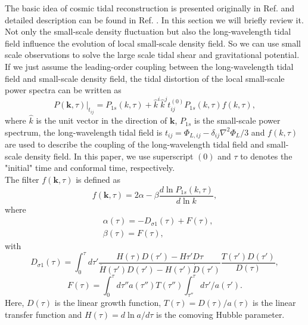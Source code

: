 The basic idea of cosmic tidal reconstruction is presented originally in 
Ref. \citep{2012:pen} and detailed description can be found in 
Ref. \citep{2015:zhu}.
In this section we will briefly review it.\\

Not only the small-scale density fluctuation but also the long-wavelength
 tidal field influence the evolution of local small-scale density field. So
 we can use small scale observations to solve the large scale tidal shear 
 and gravitational potential. If we just assume the leading-order coupling
 between the long-wavelength tidal field and small-scale density field, 
  the tidal distortion of the local small-scale power spectra can be 
  written as
\begin{equation}
P(\mathbf{k},\tau)|_{t_{ij}}=P_{1s}(k,\tau)+\hat{k}^{i}\hat{k}^{j}t_{ij}^{(0)}P_{1s}(k,\tau)f(k,\tau),
\label{equ:Pk_s}
\end{equation}
where $\hat{k}$ is the unit vector in the direction of $\mathbf{k}$, 
$P_{1s}$ is the small-scale power spectrum, the long-wavelength 
tidal field is $t_{ij}=\Phi_{L,ij}-\delta_{ij}\nabla^{2}\Phi_{L}/3$ and 
$f(k,\tau)$ are used to describe the coupling of the 
long-wavelength
tidal field and small-scale density field. In this paper, we use superscript
$(0)$ and $\tau$ to denotes the "initial" time and conformal time,
respectively. \\

The filter $f(\mathbf{k},\tau)$ is defined as
\begin{equation}
f(\mathbf{k},\tau)=2\alpha -\beta \frac{d\ln P_{1s}(k,\tau) }{d\ln k},
\label{equ:f}
\end{equation}
where 
\begin{equation}
\begin{split}
&\alpha(\tau)=-D_{\sigma 1}(\tau)+F(\tau),\\
&\beta(\tau)=F(\tau),
\end{split}
\end{equation}
with 
\begin{equation}
D_{\sigma 1}(\tau)=\int^{\tau}_{0}d\tau'\frac{H(\tau)D(\tau')-H{\tau'}D{\tau}}{\dot{H}(\tau')D(\tau')-H(\tau')\dot{D}(\tau')}\frac{T(\tau')D(\tau')}{D(\tau)},
\end{equation}
\begin{equation}
F(\tau)=\int^{\tau}_{0}d\tau''a(\tau'')T(\tau'')\int^{\tau}_{\tau''}d\tau'/a(\tau').
\end{equation}
Here, $D(\tau)$ is the linear growth function, $T(\tau)=D(\tau)/a(\tau)$ is the linear transfer function and $H(\tau)=d\ln a/d\tau$ is the comoving Hubble parameter.\\

